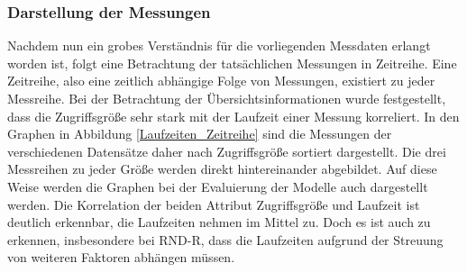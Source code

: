 \documentclass[
	12pt,
	a4paper,
	BCOR10mm,
	DIV14,
	listof=totoc,
	bibliography=totoc,
	headsepline
]{scrreprt}
\begin{document}
\subsubsection{Darstellung der Messungen}
Nachdem nun ein grobes Verständnis für die vorliegenden Messdaten erlangt worden ist, folgt eine Betrachtung der tatsächlichen Messungen in Zeitreihe.
Eine Zeitreihe, also eine zeitlich abhängige Folge von Messungen, existiert zu jeder Messreihe.
Bei der Betrachtung der Übersichtsinformationen wurde festgestellt, dass die Zugriffsgröße sehr stark mit der Laufzeit einer Messung korreliert.
In den Graphen in Abbildung \ref{Laufzeiten_Zeitreihe} sind die Messungen der verschiedenen Datensätze daher nach Zugriffsgröße sortiert dargestellt. Die drei Messreihen zu jeder Größe werden direkt hintereinander abgebildet. Auf diese Weise werden die Graphen bei der Evaluierung der Modelle auch dargestellt werden.
Die Korrelation der beiden Attribut Zugriffsgröße und Laufzeit ist deutlich erkennbar, die Laufzeiten nehmen im Mittel zu. Doch es ist auch zu erkennen, insbesondere bei RND-R, dass die Laufzeiten aufgrund der Streuung von weiteren Faktoren abhängen müssen.\medskip
\end{document}
